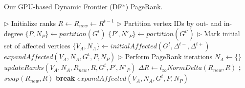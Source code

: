 \begin{algorithm}[!hbt]
\caption{Our GPU-based Dynamic Frontier (DF*) PageRank.}
\label{alg:frontier}
\begin{algorithmic}[1]

\Statex

  \State $\rhd$ Initialize ranks
  \State $R \gets R_{new} \gets R^{t-1}$ \label{alg:frontier--initialize}
  \State $\rhd$ Partition vertex IDs by out- and in-degree 
  \State $\{P, N_P\} \gets partition(G^t)$
  \State $\{P', N'_P\} \gets partition(G^{t'})$
  \State $\rhd$ Mark initial set of affected vertices
  \State $\{V_A, N_A\} \gets initialAffected(G^t, \Delta^{t-}, \Delta^{t+})$
  \State $expandAffected(V_A, N_A, G^t, P, N_P)$
  \State $\rhd$ Perform PageRank iterations
  \ForAll{$i \in [0 .. MAX\_ITERATIONS)$} \label{alg:frontier--compute-begin}
    \State $N_A \gets \{\}$
    \State $updateRanks(V_A, N_A, R_{new}, R, G^t, P', N'_P)$
    \State $\Delta R \gets l_{\infty}NormDelta(R_{new}, R)$ \textbf{;} $swap(R_{new}, R)$
     \textbf{break}
    \EndIf
    \State $expandAffected(V_A, N_A, G^t, P, N_P)$
  \EndFor \label{alg:frontier--compute-end}
  \State {} \label{alg:frontier--return}
\EndFunction

\Statex


\end{algorithmic}
\end{algorithm}
